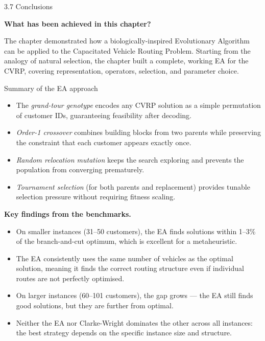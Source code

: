 \documentclass[aspectratio=169,10pt]{beamer}
\begin{document}
\begin{frame}[allowframebreaks]{3.7 Conclusions}

  \textbf{What has been achieved in this chapter?}

  The chapter demonstrated how a biologically-inspired Evolutionary Algorithm can be applied
  to the Capacitated Vehicle Routing Problem.
  Starting from the analogy of natural selection, the chapter built a complete, working EA
  for the CVRP, covering representation, operators, selection, and parameter choice.

  \medskip
  \begin{block}{Summary of the EA approach}
    \begin{itemize}
      \item The \emph{grand-tour genotype} encodes any CVRP solution as a simple
            permutation of customer IDs, guaranteeing feasibility after decoding.
      \item \emph{Order-1 crossover} combines building blocks from two parents
            while preserving the constraint that each customer appears exactly once.
      \item \emph{Random relocation mutation} keeps the search exploring and prevents
            the population from converging prematurely.
      \item \emph{Tournament selection} (for both parents and replacement) provides
            tunable selection pressure without requiring fitness scaling.
    \end{itemize}
  \end{block}

  \framebreak

  \textbf{Key findings from the benchmarks.}

  \begin{itemize}
    \item On smaller instances (31--50 customers), the EA finds solutions within 1--3\%
          of the branch-and-cut optimum, which is excellent for a metaheuristic.
    \item The EA consistently uses the same number of vehicles as the optimal solution,
          meaning it finds the correct routing structure even if individual routes are not
          perfectly optimised.
    \item On larger instances (60--101 customers), the gap grows — the EA still finds
          good solutions, but they are further from optimal.
    \item Neither the EA nor Clarke-Wright dominates the other across all instances:
          the best strategy depends on the specific instance size and structure.
  \end{itemize}


\end{frame}
\end{document}
